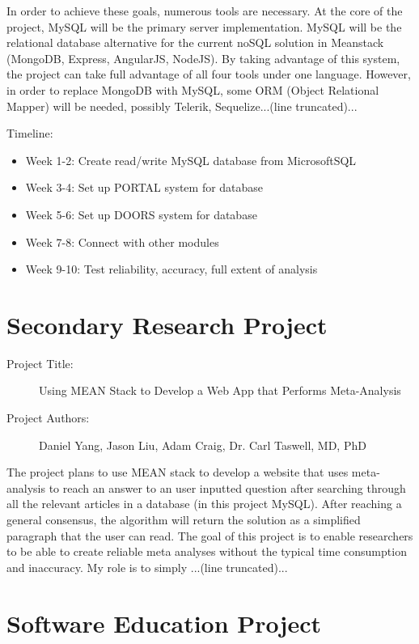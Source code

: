 \documentclass[12pt]{article}
\begin{document}
	In order to achieve these goals, numerous tools are necessary. At the core of the project, MySQL will be the primary server implementation. MySQL will be the relational database alternative for the current noSQL solution in Meanstack (MongoDB, Express, AngularJS, NodeJS). By taking advantage of this system, the project can take full advantage of all four tools under one language. However, in order to replace MongoDB with MySQL, some ORM (Object Relational Mapper) will be needed, possibly Telerik, Sequelize...(line truncated)...

\hfill


Timeline:
\begin{itemize}
	\item Week 1-2: Create read/write MySQL database from MicrosoftSQL
	\item Week 3-4: Set up PORTAL system for database
	\item Week 5-6: Set up DOORS system for database
	\item Week 7-8: Connect with other modules 
	\item Week 9-10: Test reliability, accuracy, full extent of analysis
\end{itemize}

\section{Secondary Research Project}

\begin{description}
\item[Project Title:]{Using MEAN Stack to Develop a Web App that Performs Meta-Analysis}
\item[Project Authors:] Daniel Yang, Jason Liu, Adam Craig, Dr. Carl Taswell, MD, PhD
\end{description}
	The project plans to use MEAN stack to develop a website that uses meta-analysis to reach an answer to an user inputted question after searching through all the relevant articles in a database (in this project MySQL). After reaching a general consensus, the algorithm will return the solution as a simplified paragraph that the user can read. The goal of this project is to enable researchers to be able to create reliable meta analyses without the typical time consumption and inaccuracy. My role is to simply ...(line truncated)...

\section{Software Education Project}
\end{document}
